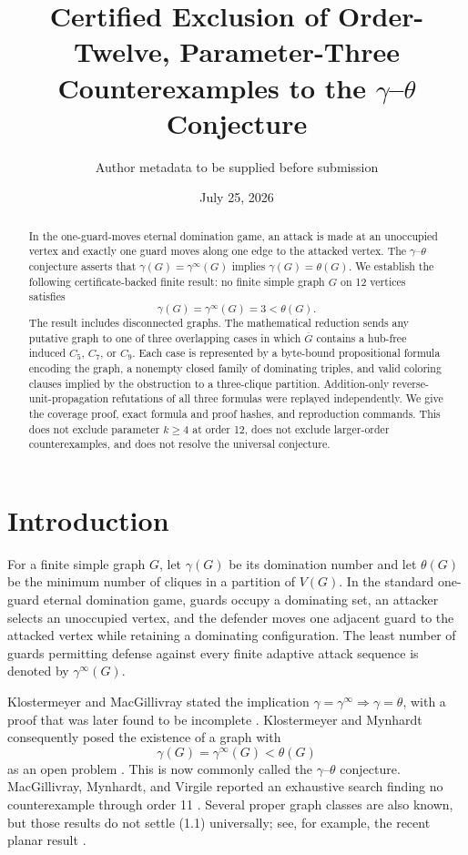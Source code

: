 \documentclass[11pt]{article}
\title{Certified Exclusion of Order-Twelve, Parameter-Three\\
Counterexamples to the \texorpdfstring{$\gamma$--$\theta$}{gamma--theta}
Conjecture}
\author{Author metadata to be supplied before submission}
\date{July 25, 2026}
\theoremstyle{definition}
\theoremstyle{remark}
\newcommand{\gaminf}{\gamma^{\infty}}
\newcommand{\V}{V}
\begin{document}
\maketitle

\begin{abstract}
In the one-guard-moves eternal domination game, an attack is made at an
unoccupied vertex and exactly one guard moves along one edge to the attacked
vertex.  The $\gamma$--$\theta$ conjecture asserts that
\(\gamma(G)=\gaminf(G)\) implies \(\gamma(G)=\theta(G)\).
We establish the following certificate-backed finite result:
no finite simple graph \(G\) on 12 vertices satisfies
\[
  \gamma(G)=\gaminf(G)=3<\theta(G).
\]
The result includes disconnected graphs.  The mathematical reduction sends
any putative graph to one of three overlapping cases in which
\(\overline G\) contains a hub-free induced \(C_5\), \(C_7\), or \(C_9\).
Each case is represented by a byte-bound propositional formula encoding the
graph, a nonempty closed family of dominating triples, and valid coloring
clauses implied by the obstruction to a three-clique partition.  Addition-only
reverse-unit-propagation refutations of all three formulas were replayed
independently.  We give the
coverage proof, exact formula and proof hashes, and reproduction commands.
This does not exclude parameter \(k\geq4\) at order 12, does not exclude
larger-order counterexamples, and does not resolve the universal conjecture.
\end{abstract}

\section{Introduction}

For a finite simple graph \(G\), let \(\gamma(G)\) be its domination number
and let \(\theta(G)\) be the minimum number of cliques in a partition of
\(\V(G)\).  In the standard one-guard eternal domination game, guards occupy
a dominating set, an attacker selects an unoccupied vertex, and the defender
moves one adjacent guard to the attacked vertex while retaining a dominating
configuration.  The least number of guards permitting defense against every
finite adaptive attack sequence is denoted by \(\gaminf(G)\).

Klostermeyer and MacGillivray stated the implication
\(\gamma=\gaminf\Rightarrow\gamma=\theta\), with a proof that was later
found to be incomplete \cite{KlostermeyerMacGillivray2009,
KlostermeyerMynhardt2015}.  Klostermeyer and Mynhardt consequently posed the
existence of a graph with
\[
  \gamma(G)=\gaminf(G)<\theta(G)
\tag{1.1}
\]
as an open problem \cite{KlostermeyerMynhardt2015,
KlostermeyerMynhardt2016}.  This is now commonly called the
\(\gamma\)--\(\theta\) conjecture.  MacGillivray, Mynhardt, and Virgile
reported an exhaustive search finding no counterexample through order 11
\cite{MacGillivrayMynhardtVirgile2022}.  Several proper graph classes are
also known, but those results do not settle (1.1) universally; see, for
example, the recent planar result \cite{Taletskii2024}.
\end{document}
